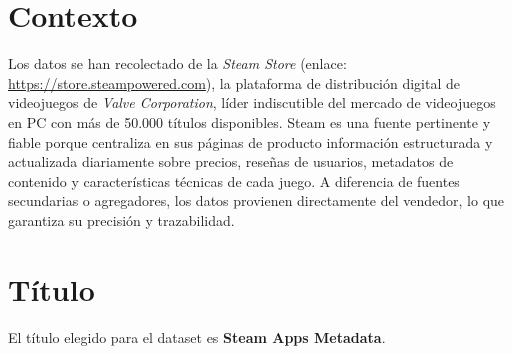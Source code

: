 \documentclass[
]{article}
\author{}
\date{\vspace{-2.5em}}
\begin{document}
\sinportada


\section{Contexto}\label{contexto}

Los datos se han recolectado de la \textit{Steam Store} (enlace: \url{https://store.steampowered.com}), la plataforma de distribución digital de videojuegos de \textit{Valve Corporation}, líder indiscutible del mercado de videojuegos en PC con más de 50.000 títulos disponibles. Steam es una fuente pertinente y fiable porque centraliza en sus páginas de producto información estructurada y actualizada diariamente sobre precios, reseñas de usuarios, metadatos de contenido y características técnicas de cada juego. A diferencia de fuentes secundarias o agregadores, los datos provienen directamente del vendedor, lo que garantiza su precisión y trazabilidad.

\section{Título}\label{tuxedtulo}

El título elegido para el dataset es \textbf{Steam Apps Metadata}.
\end{document}
